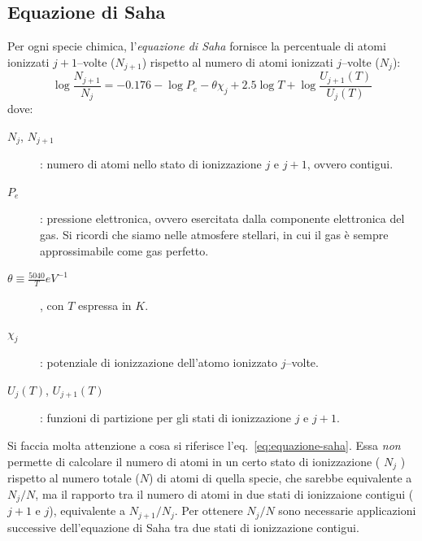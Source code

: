 \subsection{Equazione di Saha}\label{sec:equazione-saha}
Per ogni specie chimica, l'\emph{equazione di Saha} fornisce la percentuale di atomi ionizzati $j+1$--volte ($N_{j+1}$) rispetto al numero di atomi ionizzati $j$--volte ($N_j$):
\begin{equation}\label{eq:equazione-saha}
    \log \dfrac{N_{j+1}}{N_j} = -0.176 - \log P_e - \theta \chi_j + 2.5 \log T + \log \dfrac{{U_{j+1}}(T)}{{U_j}(T)}
\end{equation}
dove:
\begin{description}
    \item[$N_j$, $N_{j+1}$]: numero di atomi nello stato di ionizzazione $j$ e $j+1$, ovvero contigui.
    \item[$P_e$]: pressione elettronica, ovvero esercitata dalla componente elettronica del gas. Si ricordi che siamo nelle atmosfere stellari, in cui il gas è sempre approssimabile come gas perfetto.
    \item[$\theta \equiv \frac{5040}{T} \si{eV^{-1}}$], con $T$ espressa in $\si{K}$.
    \item[$\chi_j$]: potenziale di ionizzazione dell'atomo ionizzato $j$--volte.
    \item[${U_j}(T)$, ${U_{j+1}}(T)$]: funzioni di partizione per gli stati di ionizzazione $j$ e $j+1$.
\end{description}
Si faccia molta attenzione a cosa si riferisce l'eq.~\eqref{eq:equazione-saha}. Essa \emph{non} permette di calcolare il numero di atomi in un certo stato di ionizzazione ( $N_j$ ) rispetto al numero totale ($N$) di atomi di quella specie, che sarebbe equivalente a $N_j / N$, ma il rapporto tra il numero di atomi in due stati di ionizzaione contigui ($j+1$ e $j$), equivalente a $N_{j+1} / N_j$. Per ottenere $N_j / N$ sono necessarie applicazioni successive dell'equazione di Saha tra due stati di ionizzazione contigui.

